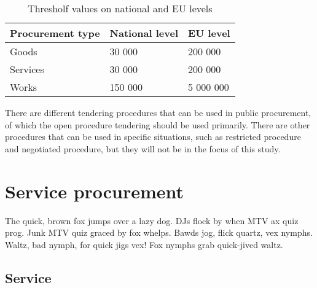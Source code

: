 \documentclass[12pt,a4paper,oneside,pdftex]{report}
\begin{document}
\begin{table}
\begin{tabular}{|p{4.5cm}|p{3.8cm}|p{4cm}|}
\hline %
\textbf{Procurement type} & \textbf{National level} & \textbf{EU level}\\
\hline
Goods & 30 000 & 200 000 \\
\hline
Services & 30 000 & 200 000 \\
\hline
Works & 150 000 & 5 000 000 \\ 
\hline
\end{tabular} %
\caption{Thresholf values on national and EU levels}
\label{table:thresholds}
\end{table} %

There are different tendering procedures that can be used in public procurement, of which the open procedure tendering should be used primarily. There are other procedures that can be used in specific situations, such as restricted procedure and negotiated procedure, but they will not be in the focus of this study. 



\section{Service procurement}

The quick, brown fox jumps over a lazy dog. DJs flock by when MTV ax quiz prog. Junk MTV quiz graced by fox whelps. Bawds jog, flick quartz, vex nymphs. Waltz, bad nymph, for quick jigs vex! Fox nymphs grab quick-jived waltz. 

\subsection{Service }
\end{document}
